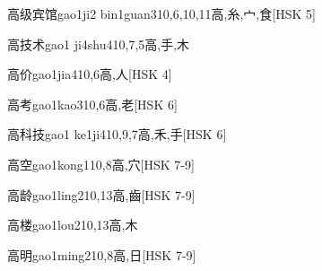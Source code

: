 \begin{EntryWithPhonetic}{高级宾馆}{gao1ji2 bin1guan3}{10,6,10,11}{⾼,⽷,⼧,⾷}[HSK 5]
\end{EntryWithPhonetic}

\begin{EntryWithPhonetic}{高技术}{gao1 ji4shu4}{10,7,5}{⾼,⼿,⽊}
\end{EntryWithPhonetic}

\begin{EntryWithPhonetic}{高价}{gao1jia4}{10,6}{⾼,⼈}[HSK 4]
\end{EntryWithPhonetic}

\begin{EntryWithPhonetic}{高考}{gao1kao3}{10,6}{⾼,⽼}[HSK 6]
\end{EntryWithPhonetic}

\begin{EntryWithPhonetic}{高科技}{gao1 ke1ji4}{10,9,7}{⾼,⽲,⼿}[HSK 6]
\end{EntryWithPhonetic}

\begin{EntryWithPhonetic}{高空}{gao1kong1}{10,8}{⾼,⽳}[HSK 7-9]
\end{EntryWithPhonetic}

\begin{EntryWithPhonetic}{高龄}{gao1ling2}{10,13}{⾼,⿒}[HSK 7-9]
\end{EntryWithPhonetic}

\begin{EntryWithPhonetic}{高楼}{gao1lou2}{10,13}{⾼,⽊}
\end{EntryWithPhonetic}

\begin{EntryWithPhonetic}{高明}{gao1ming2}{10,8}{⾼,⽇}[HSK 7-9]
\end{EntryWithPhonetic}

